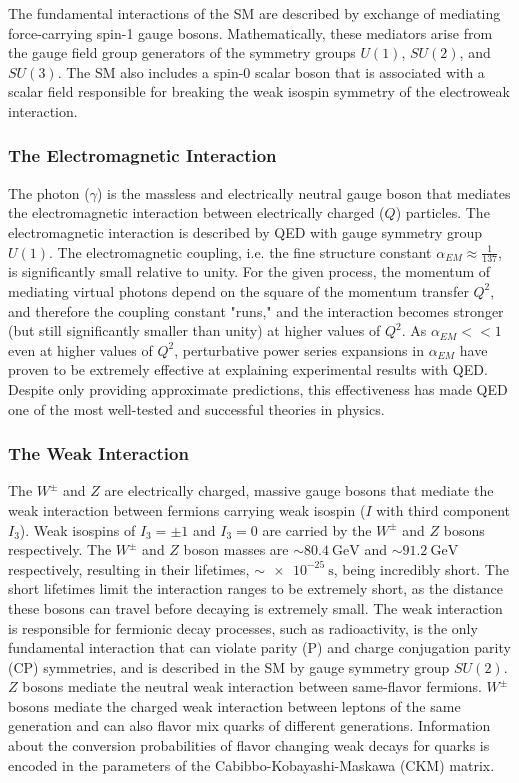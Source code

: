 The fundamental interactions of the SM are described by exchange of mediating force-carrying spin-1 gauge bosons.
Mathematically, these mediators arise from the gauge field group generators of the symmetry groups $U(1)$, $SU(2)$, and $SU(3)$.
The SM also includes a spin-0 scalar boson that is associated with a scalar field responsible for breaking the weak isospin symmetry of the electroweak interaction.

\subsubsection{The Electromagnetic Interaction}
The photon ($\gamma$) is the massless and electrically neutral gauge boson that mediates the electromagnetic interaction between electrically charged ($Q$) particles.
The electromagnetic interaction is described by QED with gauge symmetry group $U(1)$.
The electromagnetic coupling, i.e. the fine structure constant $\alpha_{EM} \approx \frac{1}{137}$, is significantly small relative to unity.
For the given process, the momentum of mediating virtual photons depend on the square of the momentum transfer $Q^2$, and therefore the coupling constant "runs," and the interaction becomes stronger (but still significantly smaller than unity) at higher values of $Q^2$.
As $\alpha_{EM} << 1$ even at higher values of $Q^2$, perturbative power series expansions in $\alpha_{EM}$ have proven to be extremely effective at explaining experimental results with QED.
Despite only providing approximate predictions, this effectiveness has made QED one of the most well-tested and successful theories in physics.

\subsubsection{The Weak Interaction}
The $W^\pm$ and $Z$ are electrically charged, massive gauge bosons that mediate the weak interaction between fermions carrying weak isospin ($I$ with third component $I_3$).
Weak isospins of $I_3 = \pm 1$ and $I_3 = 0$ are carried by the $W^\pm$ and $Z$ bosons respectively.
The $W^\pm$ and $Z$ boson masses are $\sim \SI{80.4}{\GeV}$ and $\sim \SI{91.2}{\GeV}$ respectively, resulting in their lifetimes, $\sim \SI{e-25}{\s}$, being incredibly short.
The short lifetimes limit the interaction ranges to be extremely short, as the distance these bosons can travel before decaying is extremely small.
The weak interaction is responsible for fermionic decay processes, such as radioactivity, is the only fundamental interaction that can violate parity (P) and charge conjugation parity (CP) symmetries, and is described in the SM by gauge symmetry group $SU(2)$.
$Z$ bosons mediate the neutral weak interaction between same-flavor fermions.
$W^\pm$ bosons mediate the charged weak interaction between leptons of the same generation and can also flavor mix quarks of different generations.
Information about the conversion probabilities of flavor changing weak decays for quarks is encoded in the parameters of the Cabibbo-Kobayashi-Maskawa (CKM) matrix.

